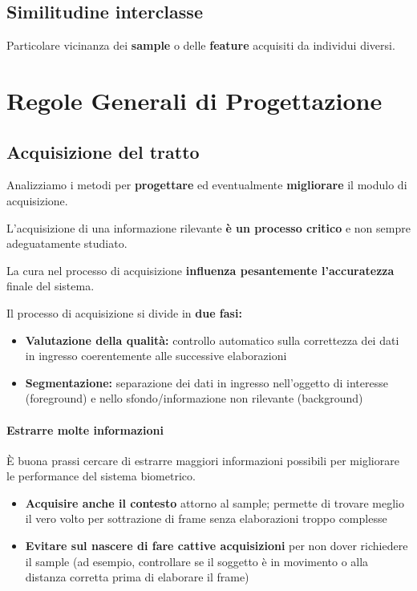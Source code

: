 \documentclass{report}
\begin{document}
\section{Similitudine interclasse}

Particolare vicinanza dei \textbf{sample} o delle \textbf{feature} acquisiti da individui diversi.





\chapter{Regole Generali di Progettazione}

\section{Acquisizione del tratto}

Analizziamo i metodi per \textbf{progettare} ed eventualmente \textbf{migliorare} il modulo di acquisizione.

\noindent L'acquisizione di una informazione rilevante \textbf{è un processo critico} e non sempre adeguatamente studiato.

\noindent La cura nel processo di acquisizione \textbf{influenza pesantemente l'accuratezza} finale del sistema.

Il processo di acquisizione si divide in \textbf{due fasi:}
\begin{itemize}
    \item \textbf{Valutazione della qualità:} controllo automatico sulla correttezza dei dati in ingresso coerentemente alle successive elaborazioni
    \item \textbf{Segmentazione:} separazione dei dati in ingresso nell'oggetto di interesse (foreground) e nello sfondo/informazione non rilevante (background)
\end{itemize}

\subsubsection{Estrarre molte informazioni}

È buona prassi cercare di estrarre maggiori informazioni possibili per migliorare le performance del sistema biometrico.
\begin{itemize}
    \item \textbf{Acquisire anche il contesto} attorno al sample; permette di trovare meglio il vero volto per sottrazione di frame senza elaborazioni troppo complesse
    \item \textbf{Evitare sul nascere di fare cattive acquisizioni} per non dover richiedere il sample (ad esempio, controllare se il soggetto è in movimento o alla distanza corretta prima di elaborare il frame)
\end{itemize}
\end{document}
